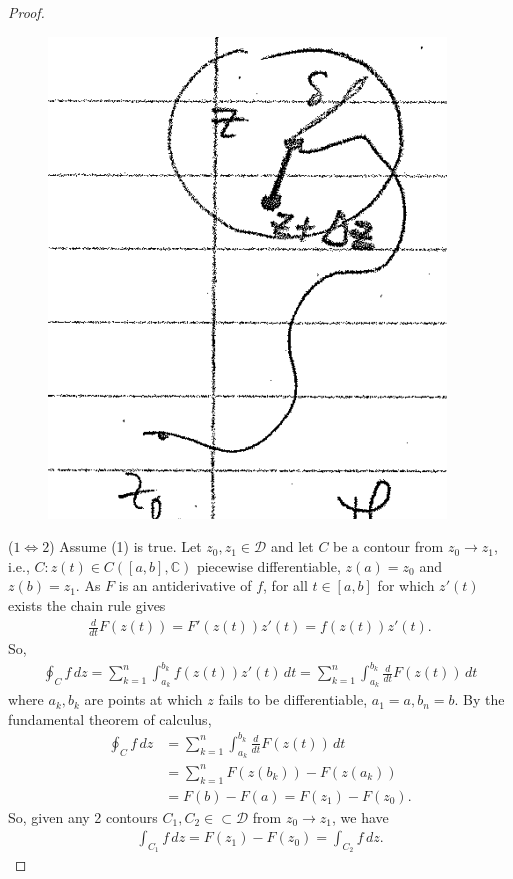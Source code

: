 \documentclass{article}
\theoremstyle{definition}
\newcommand{\f}[2]{\frac{#1}{#2}}
\newcommand{\C}{\mathbb{C}}
\newcommand{\nn}{\nonumber}
\begin{document}
\begin{proof}
	
	
	
	
	\begin{figure}[!htb]
		\centering
		\includegraphics[scale=0.25]{tfae}
	\end{figure}
	
	
	($1\iff 2$) Assume (1) is true. Let $z_0, z_1 \in \mathcal{D}$ and let $C$ be a contour from $z_0 \to z_1$, i.e., $C: z(t) \in C([a,b],\C)$ piecewise differentiable, $z(a) = z_0$ and $z(b)= z_1$. As $F$ is an antiderivative of $f$, for all $t\in [a,b]$ for which $z'(t)$ exists the chain rule gives 
	\begin{align}
	\f{d}{dt}F(z(t)) = F'(z(t))z'(t) = f(z(t))z'(t).
	\end{align}
	So,
	\begin{align}
	\oint_C f\,dz = \sum^n_{k=1}\int^{b_k}_{a_k}f(z(t))z'(t)\,dt = \sum^n_{k=1}\int^{b_k}_{a_k} \f{d}{dt}F(z(t))\,dt
	\end{align}
	where $a_k ,b_k$ are points at which $z$ fails to be differentiable, $a_1 = a, b_n = b$. By the fundamental theorem of calculus,
	\begin{align}
	\oint_C f\,dz &=\sum^n_{k=1}\int^{b_k}_{a_k} \f{d}{dt}F(z(t))\,dt\nn\\
	&= \sum^n_{k=1}F(z(b_k)) - F(z(a_k)) \nn\\
	&= F(b) - F(a) = F(z_1) - F(z_0).
	\end{align}
	So, given any 2 contours $C_1, C_2 \in \subset \mathcal{D}$ from $z_0 \to z_1$, we have
	\begin{align}
	\int_{C_1}f\,dz = F(z_1) - F(z_0) = \int_{C_2}f\,dz.
	\end{align}
	

\end{proof}
\end{document}
